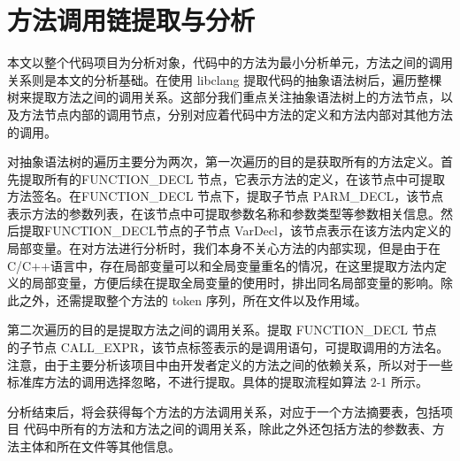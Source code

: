 \section{方法调用链提取与分析}
本文以整个代码项目为分析对象，代码中的方法为最小分析单元，方法之间的调用关系则是本文的分析基础。在使用 libclang 提取代码的抽象语法树后，遍历整棵树来提取方法之间的调用关系。这部分我们重点关注抽象语法树上的方法节点，以及方法节点内部的调用节点，分别对应着代码中方法的定义和方法内部对其他方法的调用。


对抽象语法树的遍历主要分为两次，第一次遍历的目的是获取所有的方法定义。首先提取所有的FUNCTION\_DECL 节点，它表示方法的定义，在该节点中可提取方法签名。在FUNCTION\_DECL 节点下，提取子节点 PARM\_DECL，该节点表示方法的参数列表，在该节点中可提取参数名称和参数类型等参数相关信息。然后提取FUNCTION\_DECL节点的子节点 VarDecl，该节点表示在该方法内定义的局部变量。在对方法进行分析时，我们本身不关心方法的内部实现，但是由于在 C/C++语言中，存在局部变量可以和全局变量重名的情况，在这里提取方法内定义的局部变量，方便后续在提取全局变量的使用时，排出同名局部变量的影响。除此之外，还需提取整个方法的 token 序列，所在文件以及作用域。


第二次遍历的目的是提取方法之间的调用关系。提取 FUNCTION\_DECL 节点
的子节点 CALL\_EXPR，该节点标签表示的是调用语句，可提取调用的方法名。注意，由于主要分析该项目中由开发者定义的方法之间的依赖关系，所以对于一些标准库方法的调用选择忽略，不进行提取。具体的提取流程如算法 2-1 所示。

分析结束后，将会获得每个方法的方法调用关系，对应于一个方法摘要表，包括项目
代码中所有的方法和方法之间的调用关系，除此之外还包括方法的参数表、方法主体和所在文件等其他信息。


